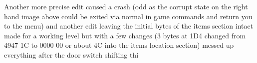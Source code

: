 \documentclass[
]{book}
\begin{document}
Another more precise edit caused a crash (odd as the corrupt state on the right hand image above could be exited via normal in game commands and return you to the menu) and another edit leaving the initial bytes of the items section intact made for a working level but with a few changes (3 bytes at 1D4 changed from 4947 1C to 0000 00 or about 4C into the items location section) messed up everything after the door switch shifting thi
\end{document}
